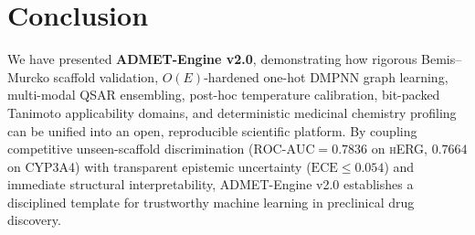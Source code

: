 \documentclass[10pt,twocolumn,letterpaper]{article}
\begin{document}
\section{Conclusion}
We have presented \textbf{ADMET-Engine v2.0}, demonstrating how rigorous Bemis–Murcko scaffold validation, $O(E)$-hardened one-hot \textsc{DMPNN} graph learning, multi-modal \textsc{QSAR} ensembling, post-hoc temperature calibration, bit-packed Tanimoto applicability domains, and deterministic medicinal chemistry profiling can be unified into an open, reproducible scientific platform. By coupling competitive unseen-scaffold discrimination ($\mathrm{ROC\text{-}AUC} = 0.7836$ on \textsc{hERG}, $0.7664$ on \textsc{CYP3A4}) with transparent epistemic uncertainty ($\mathrm{ECE} \le 0.054$) and immediate structural interpretability, ADMET-Engine v2.0 establishes a disciplined template for trustworthy machine learning in preclinical drug discovery.



\end{document}
